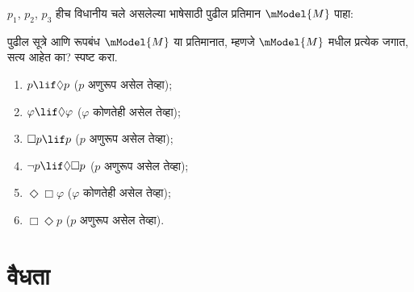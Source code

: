 \begin{prob}
  $p_1$, $p_2$, $p_3$ हीच विधानीय चले असलेल्या
  भाषेसाठी पुढील प्रतिमान $\mModel{M}$ पाहा:
  \begin{center}
  \end{center}
  पुढील सूत्रे आणि रूपबंध $\mModel{M}$ या प्रतिमानात,
  म्हणजे $\mModel{M}$ मधील प्रत्येक जगात, सत्य आहेत का? स्पष्ट करा.
  \begin{enumerate}
  \item $p\lif \Diamond p$ ($p$ अणुरूप असेल तेव्हा);
  \item $\varphi\lif \Diamond \varphi$ ($\varphi$ कोणतेही असेल तेव्हा);
  \item $\Box p \lif p$ ($p$ अणुरूप असेल तेव्हा);
  \item $\lnot p \lif \Diamond \Box p$ ($p$ अणुरूप असेल तेव्हा);
  \item $\Diamond \Box \varphi$ ($\varphi$ कोणतेही असेल तेव्हा);
  \item $\Box \Diamond p$ ($p$ अणुरूप असेल तेव्हा).
  \end{enumerate}
\end{prob}












\section{वैधता}\label{nml:syn:val:sec}

